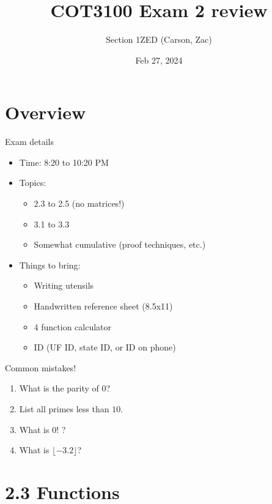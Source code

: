\documentclass[dvipsnames,t]{beamer}
\title{COT3100 Exam 2 review}
\author{Section 1ZED (Carson, Zac)}
\date{Feb 27, 2024}
\begin{document}
\frame{\titlepage}


\section{Overview}

\begin{frame}{Exam details}
\begin{itemize}
	\item Time: 8:20 to 10:20 PM
	\item Topics:
	\begin{itemize}
		\item 2.3 to 2.5 (no matrices!)
		\item 3.1 to 3.3
		\item Somewhat cumulative (proof techniques, etc.)
	\end{itemize}
	\item Things to bring:
	\begin{itemize}
		\item Writing utensils
		\item Handwritten reference sheet (8.5x11)
		\item 4 function calculator
		\item ID (UF ID, state ID, or ID on phone)
	\end{itemize}
\end{itemize}
\end{frame}

\begin{frame}{Common mistakes!}

\begin{enumerate}
    \item What is the parity of $0$?
    \item List all primes less than $10$.
    \item What is $0!$ ?
    \item What is $\lfloor -3.2 \rfloor$?
\end{enumerate}

\end{frame}

\section{2.3 Functions}
\end{document}
